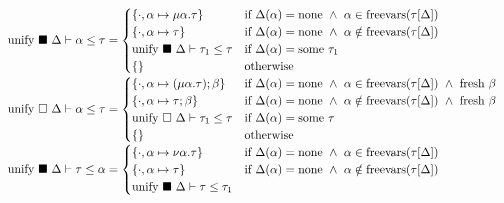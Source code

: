 \documentclass[sigplan,screen]{acmart}
\begin{document}
\begin{figure*}[h]
  \[
    \begin{array}{l @{} l}
      \text{unify } \blacksquare\ \Delta \vdash \alpha \leq \tau	
      &{} =
      \begin{cases}  
        \{ \cdot,\alpha \mapsto \mu\alpha.\tau \}
        & \text{if } 
        \Delta(\alpha) = \text{none} \ \wedge\
        \alpha \in \text{freevars}(\tau[\Delta])
        \\
        \{ \cdot,\alpha \mapsto \tau \}
        & \text{if } 
        \Delta(\alpha) = \text{none} \ \wedge\ 
        \alpha \notin \text{freevars}(\tau[\Delta])
        \\
        \text{unify } \blacksquare\ \Delta \vdash \tau_1 \leq \tau
        &\text{if }
        \Delta(\alpha) = \text{some } \tau_1
        \\
        \{\}
        &\text{otherwise}
      \end{cases}
      \\
      \text{unify } \square\ \Delta \vdash \alpha \leq \tau	
      &{} =
      \begin{cases}  
        \{ \cdot,\alpha \mapsto (\mu\alpha.\tau);\beta \}
        & \text{if } 
        \Delta(\alpha) = \text{none} \ \wedge\ 
        \alpha \in \text{freevars}(\tau[\Delta]) \ \wedge\ 
        \text{fresh } \beta
        \\
        \{ \cdot,\alpha \mapsto \tau;\beta \}
        & \text{if } 
        \Delta(\alpha) = \text{none} \ \wedge\ 
        \alpha \notin \text{freevars}(\tau[\Delta]) \ \wedge\ 
        \text{fresh } \beta
        \\
        \text{unify } \square\ \Delta \vdash \tau_1 \leq \tau
        &\text{if }
        \Delta(\alpha) = \text{some } \tau
        \\
        \{\}
        &\text{otherwise}
      \end{cases}
      \\
      \text{unify } \blacksquare\ \Delta \vdash \tau \leq \alpha 	
      &{} =
      \begin{cases}  
        \{ \cdot,\alpha \mapsto \nu\alpha.\tau \}
        & \text{if } 
        \Delta(\alpha) = \text{none} \ \wedge\
        \alpha \in \text{freevars}(\tau[\Delta])
        \\
        \{ \cdot,\alpha \mapsto \tau \}
        & \text{if } 
        \Delta(\alpha) = \text{none} \ \wedge\ 
        \alpha \notin \text{freevars}(\tau[\Delta])
        \\
        \text{unify } \blacksquare\ \Delta \vdash \tau \leq \tau_1

\end{cases}
\end{array}\]
\end{figure*}
\end{document}
